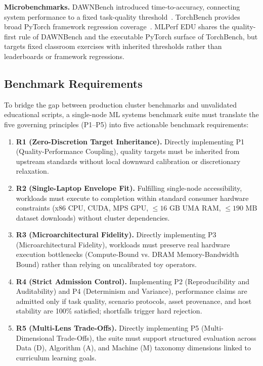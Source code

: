 \documentclass[10pt,twocolumn]{article}
\begin{document}
\textbf{Microbenchmarks.} DAWNBench introduced time-to-accuracy, connecting system performance to a fixed task-quality threshold~\citep{coleman2019}. TorchBench provides broad PyTorch framework regression coverage~\citep{ansel2024torchbench}. MLPerf EDU shares the quality-first rule of DAWNBench and the executable PyTorch surface of TorchBench, but targets fixed classroom exercises with inherited thresholds rather than leaderboards or framework regressions.

\subsection{Benchmark Requirements}

To bridge the gap between production cluster benchmarks and unvalidated educational scripts, a single-node ML systems benchmark suite must translate the five governing principles (P1--P5) into five actionable benchmark requirements:

\begin{enumerate}[leftmargin=*,itemsep=1.5pt]
\item \textbf{R1 (Zero-Discretion Target Inheritance).} Directly implementing P1 (Quality-Performance Coupling), quality targets must be inherited from upstream standards without local downward calibration or discretionary relaxation.
\item \textbf{R2 (Single-Laptop Envelope Fit).} Fulfilling single-node accessibility, workloads must execute to completion within standard consumer hardware constraints (x86 CPU, CUDA, MPS GPU, $\le 16\text{ GB}$ UMA RAM, $\le 190\text{ MB}$ dataset downloads) without cluster dependencies.
\item \textbf{R3 (Microarchitectural Fidelity).} Directly implementing P3 (Microarchitectural Fidelity), workloads must preserve real hardware execution bottlenecks (Compute-Bound vs. DRAM Memory-Bandwidth Bound) rather than relying on uncalibrated toy operators.
\item \textbf{R4 (Strict Admission Control).} Implementing P2 (Reproducibility and Auditability) and P4 (Determinism and Variance), performance claims are admitted only if task quality, scenario protocols, asset provenance, and host stability are 100\% satisfied; shortfalls trigger hard rejection.
\item \textbf{R5 (Multi-Lens Trade-Offs).} Directly implementing P5 (Multi-Dimensional Trade-Offs), the suite must support structured evaluation across Data (D), Algorithm (A), and Machine (M) taxonomy dimensions linked to curriculum learning goals.
\end{enumerate}
\end{document}

